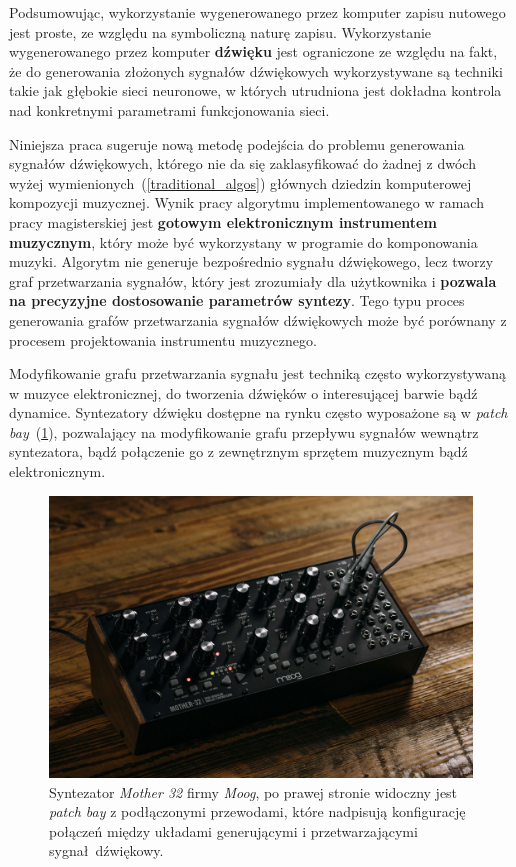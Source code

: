 Podsumowując, wykorzystanie wygenerowanego przez komputer zapisu nutowego jest proste, ze względu na symboliczną naturę zapisu.
Wykorzystanie wygenerowanego przez komputer \textbf{dźwięku} jest ograniczone ze względu na fakt, że do generowania złożonych sygnałów dźwiękowych wykorzystywane są techniki takie jak głębokie sieci neuronowe, w których utrudniona jest dokładna kontrola nad konkretnymi parametrami funkcjonowania sieci.

Niniejsza praca sugeruje nową metodę podejścia do problemu generowania sygnałów dźwiękowych,
którego nie da się zaklasyfikować do żadnej z dwóch wyżej wymienionych~(\ref{traditional_algos}) głównych dziedzin komputerowej kompozycji muzycznej.
Wynik pracy algorytmu implementowanego w ramach pracy magisterskiej jest \textbf{gotowym elektronicznym
instrumentem muzycznym}, który może być wykorzystany w programie do komponowania muzyki. Algorytm nie generuje bezpośrednio sygnału dźwiękowego, lecz tworzy graf przetwarzania sygnałów, który jest zrozumiały dla użytkownika i \textbf{pozwala na precyzyjne dostosowanie parametrów syntezy}.
Tego typu proces generowania grafów przetwarzania sygnałów dźwiękowych może być porównany z procesem projektowania instrumentu muzycznego.

Modyfikowanie grafu przetwarzania sygnału jest techniką często wykorzystywaną w muzyce
elektronicznej, do tworzenia dźwięków o interesującej barwie bądź dynamice. Syntezatory dźwięku
dostępne na rynku często wyposażone są w \textit{patch bay}~(\ref{fig:mother32}), pozwalający na modyfikowanie
grafu przepływu sygnałów wewnątrz syntezatora, bądź połączenie go z zewnętrznym sprzętem muzycznym
bądź elektronicznym.

\begin{figure}[H]
    \centering
    \includegraphics[width=0.7\linewidth]{rys01/mother32.jpg}
    \caption{
      Syntezator \textit{Mother 32} firmy \textit{Moog}, po prawej stronie widoczny
      jest \textit{patch bay} z podłączonymi przewodami, które nadpisują konfigurację
      połączeń między układami generującymi i przetwarzającymi sygnał dźwiękowy.
    }\label{fig:mother32}
\end{figure}


